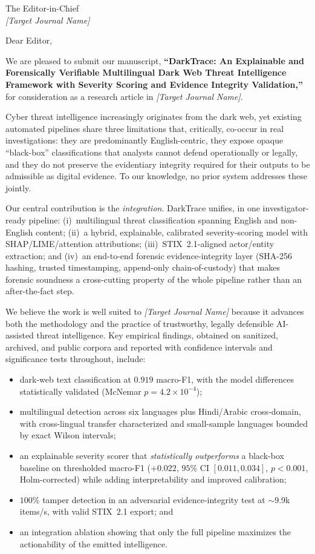 \documentclass[11pt,a4paper]{letter}
\begin{document}
\begin{letter}{The Editor-in-Chief \\ \emph{[Target Journal Name]}}

\opening{Dear Editor,}

We are pleased to submit our manuscript, \textbf{``DarkTrace: An Explainable and
Forensically Verifiable Multilingual Dark Web Threat Intelligence Framework with Severity
Scoring and Evidence Integrity Validation,''} for consideration as a research article in
\emph{[Target Journal Name]}.

Cyber threat intelligence increasingly originates from the dark web, yet existing
automated pipelines share three limitations that, critically, co-occur in real
investigations: they are predominantly English-centric, they expose opaque ``black-box''
classifications that analysts cannot defend operationally or legally, and they do not
preserve the evidentiary integrity required for their outputs to be admissible as digital
evidence. To our knowledge, no prior system addresses these jointly.

Our central contribution is the \emph{integration}. DarkTrace unifies, in one
investigator-ready pipeline: (i)~multilingual threat classification spanning English and
non-English content; (ii)~a hybrid, explainable, calibrated severity-scoring model with
SHAP/LIME/attention attributions; (iii)~STIX~2.1-aligned actor/entity extraction; and
(iv)~an end-to-end forensic evidence-integrity layer (SHA-256 hashing, trusted
timestamping, append-only chain-of-custody) that makes forensic soundness a cross-cutting
property of the whole pipeline rather than an after-the-fact step.

We believe the work is well suited to \emph{[Target Journal Name]} because it advances
both the methodology and the practice of trustworthy, legally defensible AI-assisted
threat intelligence. Key empirical findings, obtained on sanitized, archived, and public
corpora and reported with confidence intervals and significance tests throughout, include:

\begin{itemize}
  \item dark-web text classification at $0.919$ macro-F1, with the model differences
  statistically validated (McNemar $p=4.2\times10^{-4}$);
  \item multilingual detection across six languages plus Hindi/Arabic cross-domain, with
  cross-lingual transfer characterized and small-sample languages bounded by exact Wilson
  intervals;
  \item an explainable severity scorer that \emph{statistically outperforms} a black-box
  baseline on thresholded macro-F1 ($+0.022$, $95\%$ CI $[0.011,0.034]$, $p<0.001$,
  Holm-corrected) while adding interpretability and improved calibration;
  \item $100\%$ tamper detection in an adversarial evidence-integrity test at
  $\sim$9.9k items/s, with valid STIX~2.1 export; and
  \item an integration ablation showing that only the full pipeline maximizes the
  actionability of the emitted intelligence.
\end{itemize}


\end{letter}
\end{document}
